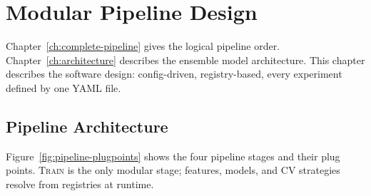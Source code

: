 \chapter{Modular Pipeline Design}
\label{ch:modular-pipeline}

Chapter~\ref{ch:complete-pipeline} gives the logical pipeline order.
Chapter~\ref{ch:architecture} describes the ensemble model architecture.
This chapter describes the software design: config-driven, registry-based, every experiment defined by one YAML file.


\section{Pipeline Architecture}
\label{sec:pipeline-architecture}

Figure~\ref{fig:pipeline-plugpoints} shows the four pipeline stages and their plug points.
\textsc{Train} is the only modular stage; features, models, and CV strategies resolve from registries at runtime.

